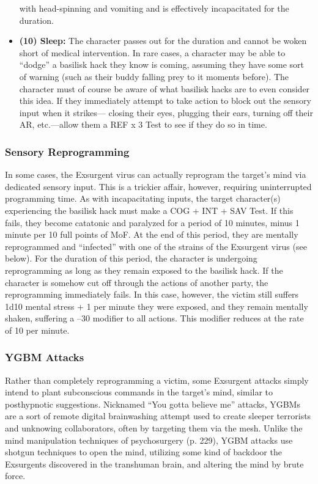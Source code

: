 \begin{itemize}
with head-spinning and vomiting and is effectively
incapacitated for the duration.
\item  \textbf{(10) Sleep:} The character passes out for the 
duration and cannot be woken short of medical 
intervention.
In rare cases, a character may be able to ``dodge'' 
a basilisk hack they know is coming, assuming they 
have some sort of warning (such as their buddy falling
prey to it moments before). The character must of
course be aware of what basilisk hacks are to even 
consider this idea. If they immediately attempt to take 
action to block out the sensory input when it strikes—
closing their eyes, plugging their ears, turning off their 
AR, etc.—allow them a REF x 3 Test to see if they do 
so in time. 
\end{itemize}

\subsubsection{Sensory Reprogramming}

In some cases, the Exsurgent virus can actually reprogram
the target's mind via dedicated sensory input.
This is a trickier affair, however, requiring uninterrupted
programming time. As with incapacitating inputs,
the target character(s) experiencing the basilisk hack 
must make a COG + INT + SAV Test. If this fails, they 
become catatonic and paralyzed for a period of 10 
minutes, minus 1 minute per 10 full points of MoF. At 
the end of this period, they are mentally reprogrammed 
and ``infected'' with one of the strains of the Exsurgent 
virus (see below). For the duration of this period, the 
character is undergoing reprogramming as long as they 
remain exposed to the basilisk hack. If the character is 
somehow cut off through the actions of another party, 
the reprogramming immediately fails. In this case, 
however, the victim still suffers 1d10 mental stress 
+ 1 per minute they were exposed, and they remain 
mentally shaken, suffering a –30 modifier to all actions. 
This modifier reduces at the rate of 10 per minute.

\subsubsection{YGBM Attacks }

Rather than completely reprogramming a victim, some 
Exsurgent attacks simply intend to plant subconscious 
commands in the target's mind, similar to posthypnotic
suggestions. Nicknamed ``You gotta believe me''
attacks, YGBMs are a sort of remote digital brainwashing
attempt used to create sleeper terrorists and
unknowing collaborators, often by targeting them via 
the mesh. Unlike the mind manipulation techniques 
of psychosurgery (p. 229), YGBM attacks use shotgun 
techniques to open the mind, utilizing some kind of 
backdoor the Exsurgents discovered in the transhuman
brain, and altering the mind by brute force.

